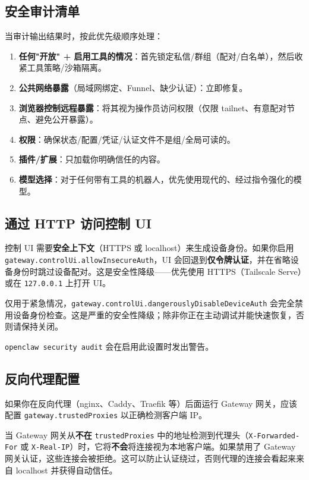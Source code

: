 \subsection{安全审计清单}


当审计输出结果时，按此优先级顺序处理：

\begin{enumerate}
  \item \textbf{任何"开放" + 启用工具的情况}：首先锁定私信/群组（配对/白名单），然后收紧工具策略/沙箱隔离。
  \item \textbf{公共网络暴露}（局域网绑定、Funnel、缺少认证）：立即修复。
  \item \textbf{浏览器控制远程暴露}：将其视为操作员访问权限（仅限 tailnet、有意配对节点、避免公开暴露）。
  \item \textbf{权限}：确保状态/配置/凭证/认证文件不是组/全局可读的。
  \item \textbf{插件/扩展}：只加载你明确信任的内容。
  \item \textbf{模型选择}：对于任何带有工具的机器人，优先使用现代的、经过指令强化的模型。
\end{enumerate}


\subsection{通过 HTTP 访问控制 UI}


控制 UI 需要\textbf{安全上下文}（HTTPS 或 localhost）来生成设备身份。如果你启用 \texttt{gateway.controlUi.allowInsecureAuth}，UI 会回退到\textbf{仅令牌认证}，并在省略设备身份时跳过设备配对。这是安全性降级——优先使用 HTTPS（Tailscale Serve）或在 \texttt{127.0.0.1} 上打开 UI。

仅用于紧急情况，\texttt{gateway.controlUi.dangerouslyDisableDeviceAuth} 会完全禁用设备身份检查。这是严重的安全性降级；除非你正在主动调试并能快速恢复，否则请保持关闭。

\texttt{openclaw security audit} 会在启用此设置时发出警告。

\subsection{反向代理配置}


如果你在反向代理（nginx、Caddy、Traefik 等）后面运行 Gateway 网关，应该配置 \texttt{gateway.trustedProxies} 以正确检测客户端 IP。

当 Gateway 网关从\textbf{不在} \texttt{trustedProxies} 中的地址检测到代理头（\texttt{X-Forwarded-For} 或 \texttt{X-Real-IP}）时，它将\textbf{不会}将连接视为本地客户端。如果禁用了 Gateway 网关认证，这些连接会被拒绝。这可以防止认证绕过，否则代理的连接会看起来来自 localhost 并获得自动信任。

